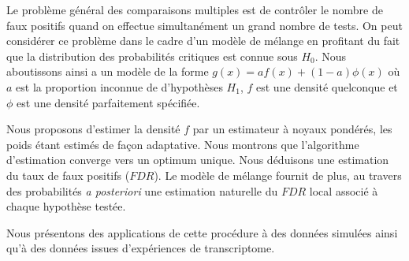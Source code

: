 \documentclass[12pt]{article}
\begin{document}
 
%
%




%  

%
%

\bigskip Le probl\`eme g\'en\'eral des comparaisons multiples est de
contr\^oler le nombre de faux positifs quand on effectue
simultan\'ement un grand nombre de tests. On peut consid\'erer ce
probl\`eme dans le cadre d'un mod\`ele de m\'elange en profitant du
fait que la distribution des probabilit\'es critiques est connue sous
$H_0$. Nous aboutissons ainsi a un mod\`ele de la forme $ g(x) = a
f(x) + (1-a) \phi(x) $ o\`u $a$ est la proportion inconnue de
d'hypoth\`eses $H_1$, $f$ est une densit\'e quelconque et $\phi$ est une
densit\'e parfaitement sp\'ecifi\'ee.

Nous proposons d'estimer la densit\'e $f$ par un estimateur \`a noyaux
pond\'er\'es, les poids \'etant estim\'es de fa\c con adaptative.
Nous montrons que l'algorithme d'estimation converge vers un optimum
unique. Nous d\'eduisons une estimation du taux de faux positifs
($FDR$). Le mod\`ele de m\'elange fournit de plus, au travers des
probabilit\'es {\it a posteriori} une estimation naturelle du $FDR$
local associ\'e \`a chaque hypoth\`ese test\'ee.

Nous pr\'esentons des applications de cette proc\'edure \`a des
donn\'ees simul\'ees ainsi qu'\`a des donn\'ees issues d'exp\'eriences
de transcriptome.
\end{document}
